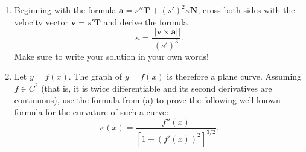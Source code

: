 \documentclass{ximera}
\begin{document}
\begin{problem}
\begin{enumerate}
\item Beginning with the formula $\mathbf{a}=s'' \mathbf{T} + (s')^{2}\kappa \mathbf{N}$, cross both sides with the velocity vector $\mathbf{v}=s'\mathbf{T}$ and derive the formula
\[ \kappa = \frac{||\mathbf{v} \times \mathbf{a}||}{(s')^{3}}. \]
Make sure to write your solution in your own words!

\item Let $y=f(x)$.  The graph of $y=f(x)$ is therefore a plane curve.  Assuming $f \in C^2$ (that is, it is twice differentiable and its second derivatives are continuous), use the formula from (a) to prove the following well-known formula for the curvature of such a curve:
\[ \kappa(x) = \dfrac{|f''(x)|}{ \left[ 1 + (f'(x))^2 \right]^{3/2}}. \]

\end{enumerate}
\end{problem}
\end{document}
